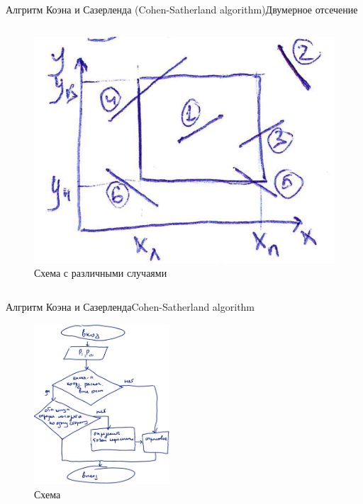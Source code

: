 \documentclass{beamer}
\begin{document}
\begin{frame}{Алгритм Коэна и Сазерленда (Cohen-Satherland algorithm)}{Двумерное отсечение}
{\begin{columns}
\begin{column}{0.5\textwidth}
\begin{figure}
						\includegraphics[width=\textwidth]{images/example.png}
						\caption{Схема с различными случаями}
					\end{figure}
				\end{column}
			\end{columns}
		}

	\end{frame}

	
	\begin{frame}{Алгритм Коэна и Сазерленда}{Cohen-Satherland algorithm}


		\begin{figure} 
			\includegraphics[width=0.45\textwidth]{images/scheme_2d.png}
			\caption{Схема}
		\end{figure}

		\note{

		}

	\end{frame}
\end{document}
